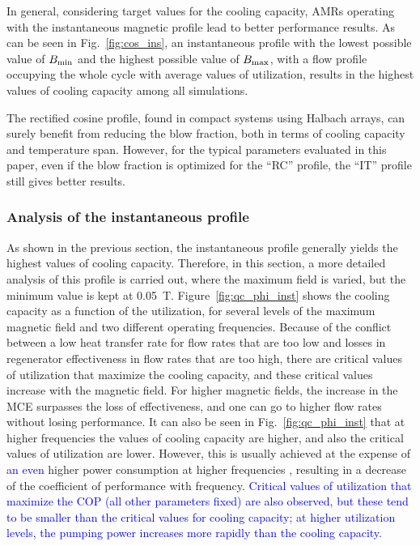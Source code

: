 \documentclass[referee]{svjour3}
\begin{document}
In general, considering target values for the cooling capacity, AMRs operating with the instantaneous magnetic profile lead to better performance results. As can be seen in Fig.~\ref{fig:cos_ins}, an instantaneous profile with the lowest possible value of $B_{\mathrm{min}}$ and the highest possible value of $B_{\mathrm{max}}$, with a flow profile occupying the whole cycle with average values of utilization, results in the highest values of cooling capacity among all simulations. 

The rectified cosine profile, found in compact systems using Halbach arrays, can surely benefit from reducing the blow fraction, both in terms of cooling capacity and temperature span. However, for the typical parameters evaluated in this paper, even if the blow fraction is optimized for the ``RC'' profile, the ``IT'' profile still gives better results.

\subsubsection{Analysis of the instantaneous profile}
\label{sec:deta-analys-inst}

As shown in the previous section, the instantaneous profile generally yields the highest values of cooling capacity. Therefore, in this section, a more detailed analysis of this profile is carried out, where the maximum field is varied, but the minimum value is kept at \SI{0.05}{\tesla}. Figure~\ref{fig:qc_phi_inst} shows the cooling capacity as a function of the utilization, for several levels of the maximum magnetic field and two different operating frequencies. Because of the conflict between a low heat transfer rate for flow rates that are too low and losses in regenerator effectiveness in flow rates that are too high, there are critical values of utilization that maximize the cooling capacity, and these critical values increase with the magnetic field. For higher magnetic fields, the increase in the MCE surpasses the loss of effectiveness, and one can go to higher flow rates without losing performance. It can also be seen in Fig.~\ref{fig:qc_phi_inst} that at  higher frequencies the values of cooling capacity are higher, and also the critical values of utilization are lower. However, this is usually achieved at the expense of \textcolor{blue}{an even} higher power consumption at higher frequencies \cite{bib:lei15_study,NIKNIA2016601}, resulting in a decrease of the coefficient of performance with frequency. \textcolor{blue}{Critical values of utilization that maximize the COP (all other parameters fixed) are also observed, but these tend to be smaller than the critical values for cooling capacity; at higher utilization levels, the pumping power increases more rapidly than the cooling capacity.}  
\end{document}
